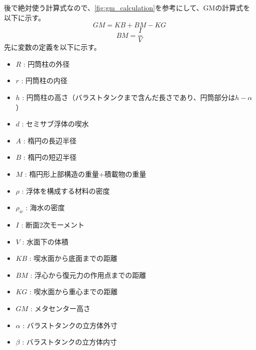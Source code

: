 \documentclass[11pt, dvipdfmx]{jsarticle}
\begin{document}
後で絶対使う計算式なので、\cref{fig:gm_calculation}を参考にして、GMの計算式を以下に示す。
\begin{equation}
    GM = KB + BM - KG
\end{equation}
\begin{equation}
    BM = \frac{I}{V}
\end{equation}
先に変数の定義を以下に示す。
\begin{itemize}
    \item $R$ : 円筒柱の外径
    \item $r$ : 円筒柱の内径
    \item $h$ : 円筒柱の高さ（バラストタンクまで含んだ長さであり、円筒部分は$h-\alpha$）
    \item $d$ : セミサブ浮体の喫水
    \item $A$ : 楕円の長辺半径
    \item $B$ : 楕円の短辺半径
    \item $M$ : 楕円形上部構造の重量+積載物の重量
    \item $\rho$ : 浮体を構成する材料の密度
    \item $\rho_w$ : 海水の密度
    \item $I$ : 断面2次モーメント
    \item $V$ : 水面下の体積
    \item $KB$ : 喫水面から底面までの距離
    \item $BM$ : 浮心から復元力の作用点までの距離
    \item $KG$ : 喫水面から重心までの距離
    \item $GM$ : メタセンター高さ
    \item $\alpha$ : バラストタンクの立方体外寸
    \item $\beta$ : バラストタンクの立方体内寸
\end{itemize}
\end{document}
